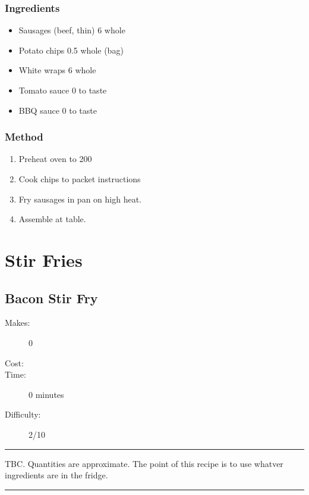 \documentclass[]{article}
\begin{document}
\subsubsection*{\Large Ingredients}
\begin{multicols}{2}
\begin{itemize}
 \item Sausages (beef, thin) \hfill 6 whole
 \item Potato chips \hfill 0.5 whole (bag)
 \item White wraps \hfill 6 whole
 \item Tomato sauce \hfill 0 to taste
 \item BBQ sauce \hfill 0 to taste
\end{itemize}
\end{multicols}
\subsubsection*{\Large Method}
\begin{enumerate}[font=\huge\color{accent}]
	\item Preheat oven to 200
	\item Cook chips to packet instructions
	\item Fry sausages in pan on high heat.
	\item Assemble at table.
\end{enumerate}
\newpage
{}
\section*{\center\Huge\color{accent}Stir Fries}
\label{cat:Stir Fries}
\label{rec:Bacon Stir Fry}
\subsection*{\center\huge Bacon Stir Fry}
\begin{description}
\item[Makes:] 0 
\item[Cost:] \textdollar
\item[Time:] 0 minutes
\item[Difficulty:] 2/10
\end{description}
\vspace{0.2cm}\hrule\vspace{0.5cm}
\begin{adjustwidth}{0.5 cm}{0.5 cm}

TBC. Quantities are approximate. The point of this recipe is to use whatver ingredients are in the fridge. \hfill\color{accent}{\Large\faGlide\hspace{0.1cm}\faTruck\hspace{0.1cm}}\color{black}

\end{adjustwidth}
\vspace{0.5cm}\hrule
\end{document}
